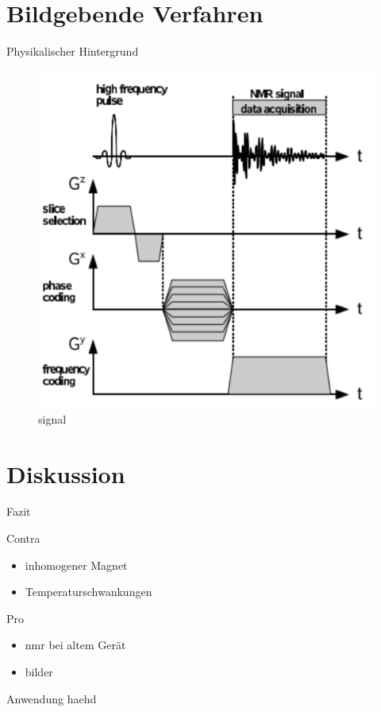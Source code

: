 \section{Bildgebende Verfahren} %
\begin{frame}{Physikalischer Hintergrund}
\begin{figure}
\centering
\includegraphics[scale=.1]{images//signal.png}
\caption{signal}
\end{figure}
\end{frame}




\section{Diskussion}
\begin{frame}{Fazit}
	\begin{alertblock}{Contra}
	\begin{itemize}
	\item inhomogener Magnet
	\item Temperaturschwankungen
	\end{itemize}
	\end{alertblock}
	\begin{exampleblock}{Pro}
	\begin{itemize}
	\item nmr bei altem Gerät
	\item bilder
	\end{itemize}
	\end{exampleblock}
\end{frame}

\begin{frame}{Anwendung}
haehd
\end{frame}